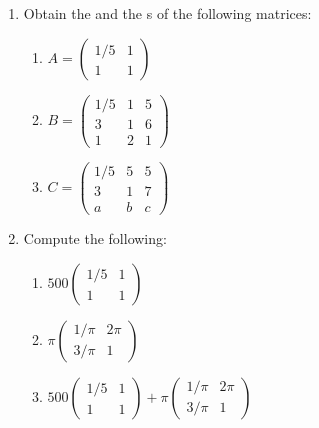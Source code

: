 \begin{enumerate}

\item 

Obtain the  and the s of the following matrices:
\begin{enumerate}

\item 

\(A = \begin{pmatrix} 1 / 5 & 1\\1 & 1\end{pmatrix}\)

\item 

\(B = \begin{pmatrix} 1 / 5 & 1 & 5\\3 & 1 & 6 \\ 1 & 2 & 1\end{pmatrix}\)

\item 

\(C = \begin{pmatrix} 1 / 5 & 5 & 5\\3 & 1 & 7 \\ a & b & c\end{pmatrix}\)

\end{enumerate}

\item 

Compute the following:
\begin{enumerate}

\item 

\(500\begin{pmatrix} 1 / 5 & 1\\1 & 1\end{pmatrix}\)

\item 

\(\pi \begin{pmatrix} 1 / \pi & 2\pi\\3/\pi & 1\end{pmatrix}\)

\item 

\(500\begin{pmatrix} 1 / 5 & 1\\1 & 1\end{pmatrix} + \pi \begin{pmatrix} 1 / \pi & 2\pi\\3/\pi & 1\end{pmatrix}\)


\end{enumerate}
\end{enumerate}
